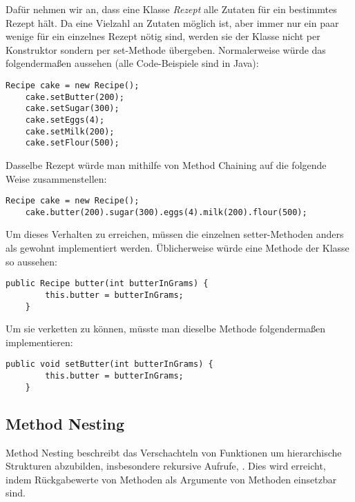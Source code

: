 Dafür nehmen wir an, dass eine Klasse \emph{Rezept} alle Zutaten für ein bestimmtes Rezept hält. Da eine Vielzahl an Zutaten möglich ist, aber immer nur ein paar wenige für ein einzelnes Rezept nötig sind, werden sie der Klasse nicht per Konstruktor sondern per set-Methode übergeben. Normalerweise würde das folgendermaßen aussehen (alle Code-Beispiele sind in Java):\\

\begin{lstlisting}[caption=Erstellung eines Rezepts auf normale Weise]
	Recipe cake = new Recipe();
	cake.setButter(200);
	cake.setSugar(300);
	cake.setEggs(4);
	cake.setMilk(200);
	cake.setFlour(500);
\end{lstlisting}

\noindent
Dasselbe Rezept würde man mithilfe von Method Chaining auf die folgende Weise zusammenstellen:\\


\begin{lstlisting}[caption=Erstellung desselben Rezepts mit Method Chaining]
	Recipe cake = new Recipe();
	cake.butter(200).sugar(300).eggs(4).milk(200).flour(500);
\end{lstlisting}

Um dieses Verhalten zu erreichen, müssen die einzelnen setter-Methoden anders als gewohnt implementiert werden. Üblicherweise würde eine Methode der Klasse so aussehen:\\

\begin{lstlisting}[caption={set-Methode, implementiert zur Aneinaderreihung}]
	public Recipe butter(int butterInGrams) {
		this.butter = butterInGrams;
	}
\end{lstlisting}

Um sie verketten zu können, müsste man dieselbe Methode folgendermaßen implementieren:\\

\begin{lstlisting}[caption=set-Methode in der üblichen Implementierung]
	public void setButter(int butterInGrams) {
		this.butter = butterInGrams;
	}
\end{lstlisting}

\subsection{Method Nesting}\label{ssct:4.1.2:nesting}
Method Nesting beschreibt das Verschachteln von Funktionen um hierarchische Strukturen abzubilden, insbesondere rekursive Aufrufe\cite{book:fowlerDSL}, \cite{vl:drachen:teil3}. Dies wird erreicht, indem Rückgabewerte von Methoden als Argumente von Methoden einsetzbar sind.

